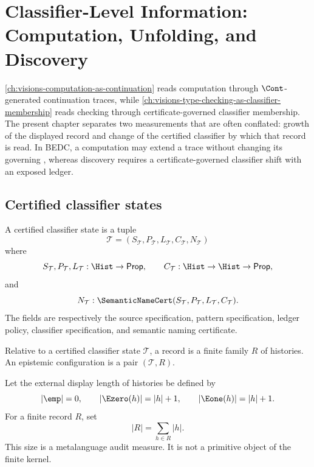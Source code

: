 \chapter{Classifier-Level Information: Computation, Unfolding, and Discovery}
\label{ch:visions-classifier-level-information}

\autoref{ch:visions-computation-as-continuation} reads computation through
$\Cont$-generated continuation traces, while
\autoref{ch:visions-type-checking-as-classifier-membership} reads checking
through certificate-governed classifier membership. The present chapter
separates two measurements that are often conflated: growth of the displayed
record and change of the certified classifier by which that record is read. In
BEDC, a computation may extend a trace without changing its governing
\NameCert{}, whereas discovery requires a certificate-governed classifier
shift with an exposed ledger.

\section{Certified classifier states}
\label{sec:classifier-level-information-states}

\begin{definition}
\label{def:certified-classifier-state}
A certified classifier state is a tuple
$$
\mathcal T=(S_{\mathcal T},P_{\mathcal T},L_{\mathcal T},C_{\mathcal T},N_{\mathcal T})
$$
where
$$
S_{\mathcal T},P_{\mathcal T},L_{\mathcal T}:\Hist\to\mathsf{Prop},
\qquad
C_{\mathcal T}:\Hist\to\Hist\to\mathsf{Prop},
$$
and
$$
N_{\mathcal T}:
\SemanticNameCert(S_{\mathcal T},P_{\mathcal T},L_{\mathcal T},C_{\mathcal T}).
$$
The fields are respectively the source specification, pattern specification,
ledger policy, classifier specification, and semantic naming certificate.
\end{definition}

\begin{definition}
\label{def:classifier-level-record-configuration}
Relative to a certified classifier state $\mathcal T$, a record is a finite
family $R$ of histories. An epistemic configuration is a pair
$(\mathcal T,R)$.
\end{definition}

\begin{definition}
\label{def:classifier-level-record-size}
Let the external display length of histories be defined by
$$
|\emp|=0,\qquad
|\Ezero(h)|=|h|+1,\qquad
|\Eone(h)|=|h|+1.
$$
For a finite record $R$, set
$$
|R|=\sum_{h\in R}|h|.
$$
This size is a metalanguage audit measure. It is not a primitive object of the
finite kernel.
\end{definition}

